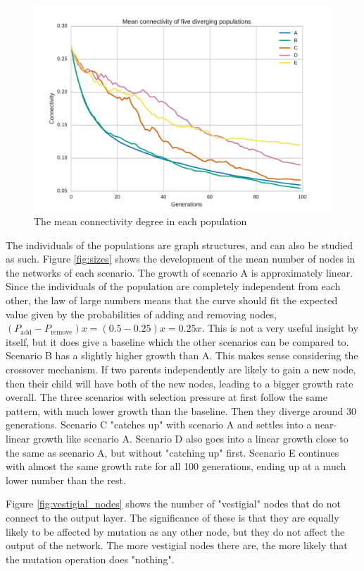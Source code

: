 \begin{figure}
\centering
\includegraphics[width=\columnwidth]{fig/connectivity}
\caption{The mean connectivity degree in each population}
\label{fig:connectivity}
\end{figure}

The individuals of the populations are graph structures, and can also be studied as such.
Figure \ref{fig:sizes} shows the development of the mean number of nodes in the networks of each scenario.
The growth of scenario A is approximately linear.
Since the individuals of the population are completely independent from each other,
the law of large numbers means that the curve should fit the expected value given by the probabilities of adding and removing nodes, $(P_\text{add} - P_\text{remove})x = (0.5 - 0.25)x = 0.25x$.
This is not a very useful insight by itself, but it does give a baseline which the other scenarios can be compared to.
Scenario B has a slightly higher growth than A.
This makes sense considering the crossover mechanism.
If two parents independently are likely to gain a new node, then their child will have both of the new nodes, leading to a bigger growth rate overall.
The three scenarios with selection pressure at first follow the same pattern, with much lower growth than the baseline.
Then they diverge around 30 generations.
Scenario C "catches up" with scenario A and settles into a near-linear growth like scenario A.
Scenario D also goes into a linear growth close to the same as scenario A, but without "catching up" first.
Scenario E continues with almost the same growth rate for all 100 generations, ending up at a much lower number than the rest.

Figure \ref{fig:vestigial_nodes} shows the number of "vestigial" nodes that do not connect to the output layer.
The significance of these is that they are equally likely to be affected by mutation as any other node, but they do not affect the output of the network.
The more vestigial nodes there are, the more likely that the mutation operation does "nothing".

